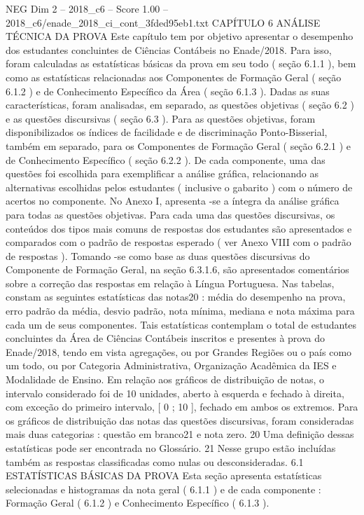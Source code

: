 \begin{textsample}{NEG Dim 2 – 2018\_c6 – Score 1.00 – 2018\_c6/enade\_2018\_ci\_cont\_3fded95eb1.txt}  \label{ex:f2_neg_238}
CAPÍTULO 6 ANÁLISE TÉCNICA DA PROVA Este capítulo tem por objetivo apresentar o desempenho dos estudantes concluintes de Ciências Contábeis no Enade/2018.
Para isso, foram calculadas as estatísticas básicas da prova em seu todo ( seção 6.1.1 ), bem como as estatísticas relacionadas aos Componentes de Formação Geral ( seção 6.1.2 ) e de Conhecimento Específico da Área ( seção 6.1.3 ).
Dadas as suas características, foram analisadas, em separado, as questões objetivas ( seção 6.2 ) e as questões discursivas ( seção 6.3 ).
Para as questões objetivas, foram disponibilizados os índices de facilidade e de discriminação Ponto-Bisserial, também em separado, para os Componentes de Formação Geral ( seção 6.2.1 ) e de Conhecimento Específico ( seção 6.2.2 ).
De cada componente, uma das questões foi escolhida para exemplificar a análise gráfica, relacionando as alternativas escolhidas pelos estudantes ( inclusive o gabarito ) com o número de acertos no componente.
No Anexo I, apresenta -se a íntegra da análise gráfica para todas as questões objetivas.
Para cada uma das questões discursivas, os conteúdos dos tipos mais comuns de respostas dos estudantes são apresentados e comparados com o padrão de respostas esperado ( ver Anexo VIII com o padrão de respostas ).
Tomando -se como base as duas questões discursivas do Componente de Formação Geral, na seção 6.3.1.6, são apresentados comentários sobre a correção das respostas em relação à Língua Portuguesa.
Nas tabelas, constam as seguintes estatísticas das notas20 : média do desempenho na prova, erro padrão da média, desvio padrão, nota mínima, mediana e nota máxima para cada um de seus componentes.
Tais estatísticas contemplam o total de estudantes concluintes da Área de Ciências Contábeis inscritos e presentes à prova do Enade/2018, tendo em vista agregações, ou por Grandes Regiões ou o país como um todo, ou por Categoria Administrativa, Organização Acadêmica da IES e Modalidade de Ensino.
Em relação aos gráficos de distribuição de notas, o intervalo considerado foi de 10 unidades, aberto à esquerda e fechado à direita, com exceção do primeiro intervalo, [ 0 ; 10 ], fechado em ambos os extremos.
Para os gráficos de distribuição das notas das questões discursivas, foram consideradas mais duas categorias : questão em branco21 e nota zero. 20 Uma definição dessas estatísticas pode ser encontrada no Glossário. 21 Nesse grupo estão incluídas também as respostas classificadas como nulas ou desconsideradas. 6.1 ESTATÍSTICAS BÁSICAS DA PROVA Esta seção apresenta estatísticas selecionadas e histogramas da nota geral ( 6.1.1 ) e de cada componente : Formação Geral ( 6.1.2 ) e Conhecimento Específico ( 6.1.3 ).

\end{textsample}
